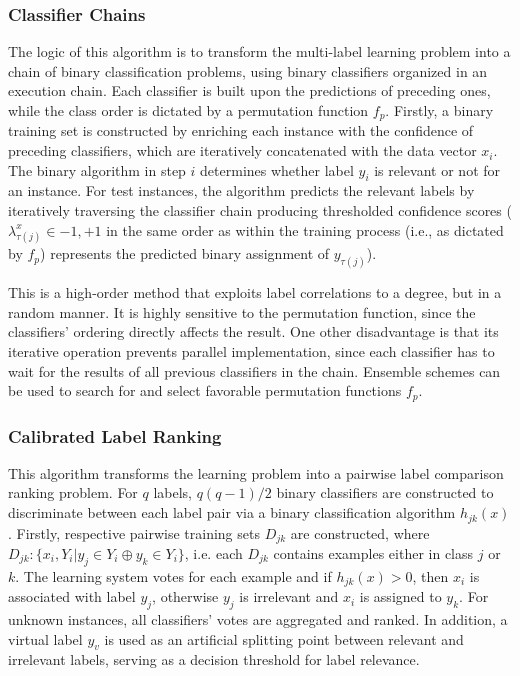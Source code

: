 \documentclass[12pt]{report}
\begin{document}
	\subsubsection*{Classifier Chains}
	The logic of this algorithm is to transform the multi-label learning problem
  into a chain of binary classification problems, using binary
  classifiers organized in an execution chain. Each classifier is built upon the predictions of
  preceding ones, while the class order is dictated by a permutation function $f_p$. Firstly, a binary training set
  is constructed by enriching each instance with the confidence of preceding
  classifiers, which are iteratively concatenated with the data vector $x_i$.
  The binary algorithm in step $i$ determines whether label $y_i$ is relevant or not for an instance. For
  test instances, the algorithm predicts the relevant labels by iteratively
  traversing the classifier chain producing thresholded confidence scores ($\lambda _{\tau(j)}^x \in {-1, +1}$ in the
  same order as within the training process (i.e., as dictated by $f_p$) represents the predicted binary assignment of $y_{\tau(j)}$).
	
	This is a high-order method that exploits label correlations to a degree, but
  in a random manner.
  It is highly sensitive to the permutation function, since the classifiers'
  ordering directly affects the result. One other disadvantage is that its
  iterative operation prevents parallel implementation, since each classifier 
  has to wait for the results of all previous classifiers in the chain.
  Ensemble schemes can be used to search for and select favorable permutation functions $f_p$.
	
	\subsubsection*{Calibrated Label Ranking}
	This algorithm transforms the learning problem into a pairwise label
  comparison ranking problem. For $q$ labels, $q(q-1)/2$ binary classifiers are
  constructed to discriminate between each label pair via a binary
  classification algorithm $h_{jk}(x)$. Firstly, respective pairwise training
  sets $D_{jk}$ are constructed, where $D_{jk}: \{x_i, Y_i | y_j \in Y_i \oplus
  y_k \in Y_i\}$, i.e. each $D_{jk}$ contains examples either in class $j$ or
  $k$. The learning system votes for each example and if $h_{jk}(x)>0$, then
  $x_i$ is associated with label $y_j$, otherwise $y_j$ is irrelevant and $x_i$
  is assigned to $y_k$. For unknown instances, all classifiers' votes are
  aggregated and ranked. In addition, a virtual label $y_v$ is used as an
  artificial splitting point between relevant and irrelevant labels, serving as
  a decision threshold for label relevance.
	
\end{document}
